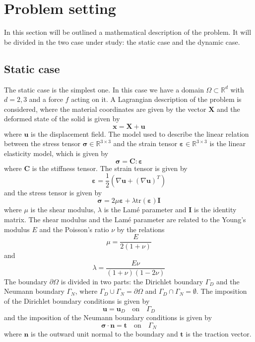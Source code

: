 \section{Problem setting}
In this section will be outlined a mathematical description of the problem. It will be divided in the two case under study: the static case and the dynamic case.

\subsection{Static case}
The static case is the simplest one. In this case we have a domain $\Omega \subset \mathbb{R}^d$ with $d=2,3$ and a force $f$ acting on it. A Lagrangian description of the problem is considered, where the material coordinates are given by the vector $\bm{X}$ and the deformed state of the solid is given by
\begin{equation}
    \bm{x} = \bm{X} + \bm{u}
\label{eq:deformation}
\end{equation}
where $\bm{u}$ is the displacement field. The model used to describe the linear relation between the stress tensor $\bm{\sigma} \in \mathbb{R}^{3\times 3}$ and the strain tensor $\bm{\varepsilon} \in \mathbb{R}^{3\times 3}$ is the linear elasticity model, which is given by
\begin{equation}
    \bm{\sigma} = \bm{C} : \bm{\varepsilon}
\label{eq:linear_elasticity}
\end{equation}
where $\bm{C}$ is the stiffness tensor. The strain tensor is given by 
\begin{equation}
    \bm{\varepsilon} = \frac{1}{2} \left( \nabla \bm{u} + (\nabla \bm{u})^T \right)
\label{eq:strain_tensor}
\end{equation}
and the stress tensor is given by
\begin{equation}
    \bm{\sigma} =  2 \mu \bm{\varepsilon} + \lambda \text{tr}(\bm{\varepsilon}) \bm{I}
\label{eq:stress_tensor}
\end{equation}
where $\mu$ is the shear modulus, $\lambda$ is the Lamé parameter and $\bm{I}$ is the identity matrix. The shear modulus and the Lamé parameter are related to the Young's modulus $E$ and the Poisson's ratio $\nu$ by the relations
\begin{equation}
    \mu = \frac{E}{2(1+\nu)}
\end{equation}
and
\begin{equation}
    \lambda = \frac{E\nu}{(1+\nu)(1-2\nu)}
\end{equation}
The boundary \( \partial \Omega \) is divided in two parts: the Dirichlet boundary \( \Gamma_D \) and the Neumann boundary \( \Gamma_N \), where \(\Gamma_D \cup \Gamma_N = \partial \Omega \) and \(\Gamma_D \cap \Gamma_N = \emptyset \). The imposition of the Dirichlet boundary conditions is given by
\begin{equation}
    \bm{u} = \bm{u}_D \quad \text{on} \quad \Gamma_D
\end{equation}
and the imposition of the Neumann boundary conditions is given by
\begin{equation}
    \bm{\sigma} \cdot \bm{n} = \bm{t} \quad \text{on} \quad \Gamma_N
\end{equation}
where \( \bm{n} \) is the outward unit normal to the boundary and \( \bm{t} \) is the traction vector. 